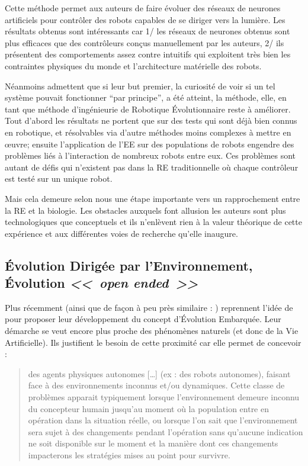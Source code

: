 Cette méthode permet aux auteurs de faire évoluer des réseaux de neurones artificiels pour contrôler des robots capables de se diriger vers la lumière. Les résultats obtenus sont intéressants car 1/ les réseaux de neurones obtenus sont plus efficaces que des contrôleurs conçus manuellement par les auteurs, 2/ ils présentent des comportements assez contre intuitifs qui exploitent très bien les contraintes physiques du monde et l'architecture matérielle des robots.

Néanmoins \cite{watson02embodiedevolutiondistributingevolutionaryalgorithmpopulationrobots} admettent que si leur but premier, la curiosité de voir si un tel système pouvait fonctionner ``par principe'', a été atteint, la méthode, elle, en tant que méthode d'ingénieurie de Robotique \'Evolutionnaire reste à améliorer. Tout d'abord les résultats ne portent que sur des tests qui sont déjà bien connus en robotique, et résolvables via d'autre méthodes moins complexes à mettre en {\oe}uvre;  ensuite  l'application de l'EE sur des populations de robots engendre des problèmes liés à l'interaction de nombreux robots entre eux. Ces problèmes sont autant de défis qui n'existent pas dans la RE traditionnelle où chaque contrôleur est testé sur un unique robot.

Mais cela demeure selon nous une étape importante vers un rapprochement entre la RE et la biologie. Les obstacles auxquels font allusion les auteurs sont plus technologiques que conceptuels et ils n'enlèvent rien à la valeur théorique de cette expérience et aux différentes voies de recherche qu'elle inaugure.

\subsection{\'Evolution Dirigée par l'Environnement, \'Evolution \emph{<<~open ended~>>}}

Plus récemment \cite{bredeche11mcmds} (ainsi que de façon à peu près similaire : \cite{trueba11taskdrivenspeciesevolutionaryroboticteams}) reprennent l'idée de \cite{watson02embodiedevolutiondistributingevolutionaryalgorithmpopulationrobots} pour proposer leur développement du concept d'\'Evolution Embarquée. Leur démarche se veut encore plus proche des phénomènes naturels (et donc de la Vie Artificielle). Ils justifient le besoin de cette proximité car elle permet de concevoir :
\begin{quotation}
   des agents physiques autonomes [\dots] (ex : des robots autonomes), faisant face à des environnements inconnus et/ou dynamiques. Cette classe de problèmes apparait typiquement lorsque l'environnement demeure inconnu du concepteur humain jusqu'au moment où la population entre en opération dans la situation réelle, ou lorsque l'on sait que l'environnement sera sujet à des changements pendant l'opération sans qu'aucune indication ne soit disponible sur le moment et la manière dont ces changements impacterons les stratégies mises au point pour survivre.
   \\\citep[p.1]{bredeche11mcmds}
\end{quotation}

